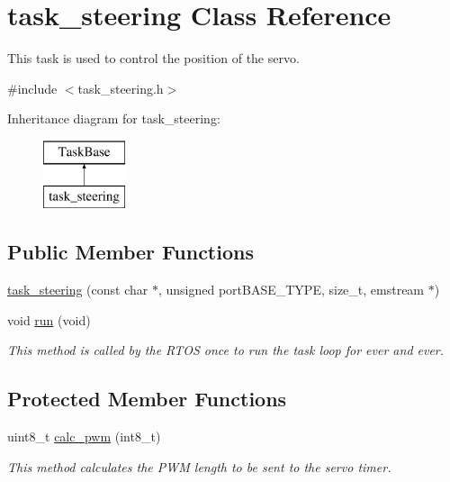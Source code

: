 \hypertarget{classtask__steering}{}\section{task\+\_\+steering Class Reference}
\label{classtask__steering}


This task is used to control the position of the servo.  




{\ttfamily \#include $<$task\+\_\+steering.\+h$>$}

Inheritance diagram for task\+\_\+steering\+:\begin{figure}[H]
\begin{center}
\leavevmode
\includegraphics[height=2.000000cm]{classtask__steering}
\end{center}
\end{figure}
\subsection*{Public Member Functions}
\begin{DoxyCompactItemize}
\item 
\mbox{\hyperlink{classtask__steering_af8a9a96908212f23d97b2f859b571c4d}{task\+\_\+steering}} (const char $\ast$, unsigned port\+B\+A\+S\+E\+\_\+\+T\+Y\+PE, size\+\_\+t, emstream $\ast$)
\item 
void \mbox{\hyperlink{classtask__steering_a223e9f1d50c0c48ff5326b7ae01ae689}{run}} (void)
\begin{DoxyCompactList}\small\item\em This method is called by the R\+T\+OS once to run the task loop for ever and ever. \end{DoxyCompactList}\end{DoxyCompactItemize}
\subsection*{Protected Member Functions}
\begin{DoxyCompactItemize}
\item 
uint8\+\_\+t \mbox{\hyperlink{classtask__steering_a6f33131ca25de22a81282b1142d939b3}{calc\+\_\+pwm}} (int8\+\_\+t)
\begin{DoxyCompactList}\small\item\em This method calculates the P\+WM length to be sent to the servo timer. \end{DoxyCompactList}\end{DoxyCompactItemize}



